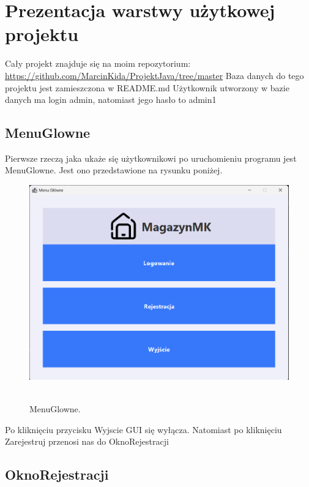 \chapter{Prezentacja warstwy użytkowej projektu}
\label{chap:Prezentacja warstwy użytkowej projektu}
Cały projekt znajduje się na moim repozytorium: \url{https://github.com/MarcinKida/ProjektJava/tree/master}
Baza danych do tego projektu jest zamieszczona w README.md 
Użytkownik utworzony w bazie danych ma login admin, natomiast jego hasło to admin1
\section{MenuGlowne}
\label{sec:MenuGlowne}
Pierwsze rzeczą jaka ukaże się użytkownikowi po uruchomieniu programu jest MenuGlowne. Jest ono przedstawione na rysunku poniżej.
\begin{figure}[H]
    \centering
    \includegraphics[width=.7\linewidth]{figures/MenuGlowne.png}\
    \caption{MenuGlowne.\label{MenuGlowne}}
\end{figure}
\clearpage
Po kliknięciu przycisku Wyjscie GUI się wyłącza. Natomiast po kliknięciu Zarejestruj przenosi nas do OknoRejestracji
\section{OknoRejestracji}
\label{sec:OknoRejestracji}

